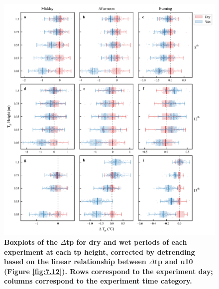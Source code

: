\documentclass[final,3p,times,authoryear]{elsarticle}
\begin{document}

\begin{figure}
\centering
\includegraphics[trim={0 0 0 0},clip,scale=1.0]{pict042.png}
\caption{\bf Boxplots of the $\Delta$\gls{tp} for dry and wet periods of each experiment at each \gls{tp} height, corrected by detrending based on the linear relationship between $\Delta$\gls{tp} and \gls{u10} (Figure \ref{fig:7.12}). Rows correspond to the experiment day; columns correspond to the experiment time category.}
 \label{fig:7.13}
\end{figure}


\end{document}
